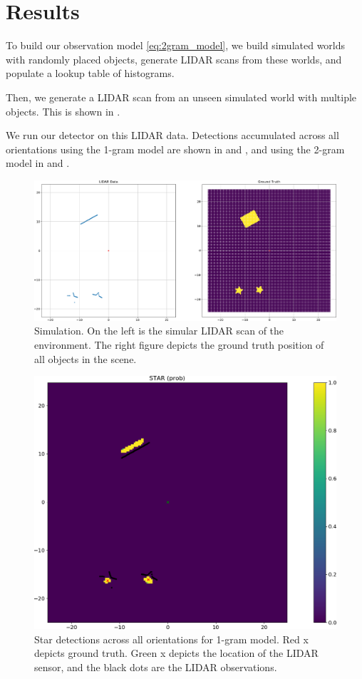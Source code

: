 \section{Results}

To build our observation model \eqref{eq:2gram_model}, we build simulated
worlds with randomly placed objects, generate LIDAR scans from these worlds, and
populate a lookup table of histograms.

Then, we generate a LIDAR scan from an unseen simulated world with multiple
objects. This is shown in .

We run our detector on this LIDAR data. Detections accumulated across all
orientations using the 1-gram model are shown in  and
, and using the 2-gram model in 
and .
%
\begin{figure}
  \centering
  \includegraphics[width=\columnwidth]{figures/ground_truth.png}
  \caption{Simulation. On the left is the simular LIDAR scan of the environment.
    The right figure depicts the ground truth position of all objects in the
    scene.}
  \label{fig:sim_world}
\end{figure}
%
\begin{figure}
  \centering
  \includegraphics[width=\columnwidth]{figures/star_1gram.png}
  \caption{Star detections across all orientations for 1-gram model. Red x
    depicts ground truth. Green x depicts the location of the LIDAR sensor, and
    the black dots are the LIDAR observations.}
  \label{fig:star_1gram}
\end{figure}
